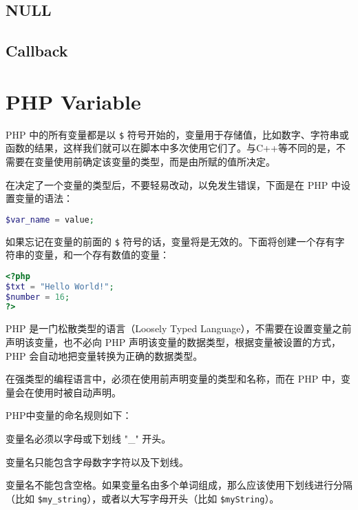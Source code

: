 \section{NULL}





\section{Callback}





\chapter{PHP Variable}






PHP 中的所有变量都是以 \texttt{\$} 符号开始的，变量用于存储值，比如数字、字符串或函数的结果，这样我们就可以在脚本中多次使用它们了。与C++等不同的是，不需要在变量使用前确定该变量的类型，而是由所赋的值所决定。


在决定了一个变量的类型后，不要轻易改动，以免发生错误，下面是在 PHP 中设置变量的语法：

\begin{lstlisting}[language=PHP]
$var_name = value;
\end{lstlisting}



如果忘记在变量的前面的 \texttt{\$} 符号的话，变量将是无效的。下面将创建一个存有字符串的变量，和一个存有数值的变量：


\begin{lstlisting}[language=PHP]
<?php
$txt = "Hello World!";
$number = 16;
?>
\end{lstlisting}


PHP 是一门松散类型的语言（Loosely Typed Language），不需要在设置变量之前声明该变量，也不必向 PHP 声明该变量的数据类型，根据变量被设置的方式，PHP 会自动地把变量转换为正确的数据类型。

在强类型的编程语言中，必须在使用前声明变量的类型和名称，而在 PHP 中，变量会在使用时被自动声明。

PHP中变量的命名规则如下：

\begin{compactitem}
\item 变量名必须以字母或下划线 "\_" 开头。
\item 变量名只能包含字母数字字符以及下划线。
\item 变量名不能包含空格。如果变量名由多个单词组成，那么应该使用下划线进行分隔（比如 \texttt{\$my\_string}），或者以大写字母开头（比如 \texttt{\$myString}）。
\end{compactitem}


